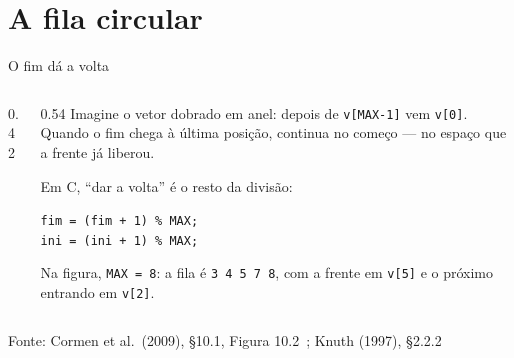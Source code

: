 \documentclass[aspectratio=169]{beamer}
\newcommand{\fonte}[1]{\vfill\hfill{\scriptsize\textcolor{UFSGray}{Fonte: #1}}}
\begin{document}
\section{A fila circular}

\begin{frame}{O fim dá a volta}
  \begin{columns}[c]
    \begin{column}{0.42\textwidth}
      \begin{center}
      \end{center}
    \end{column}
    \begin{column}{0.54\textwidth}
      \small Imagine o vetor dobrado em anel: depois de \texttt{v[MAX-1]} vem
      \texttt{v[0]}. Quando o fim chega à última posição, continua no começo
      --- no espaço que a frente já liberou.

      \medskip
      Em C, ``dar a volta'' é o resto da divisão:
      \begin{center}
        \texttt{fim = (fim + 1) \% MAX;}\\
        \texttt{ini = (ini + 1) \% MAX;}
      \end{center}
      Na figura, \texttt{MAX = 8}: a fila é \texttt{3 4 5 7 8}, com a frente
      em \texttt{v[5]} e o próximo entrando em \texttt{v[2]}.
    \end{column}
  \end{columns}
  \fonte{Cormen et al.\ (2009), §10.1, Figura 10.2~\cite{cormen2009introduction};
    Knuth (1997), §2.2.2~\cite{knuth1997art}}
\end{frame}
\end{document}
